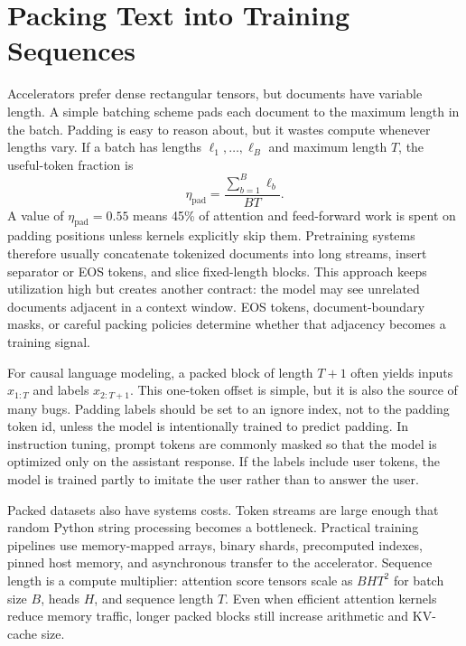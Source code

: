 \section{Packing Text into Training Sequences}
\label{sec:packing-text-training-sequences}

Accelerators prefer dense rectangular tensors, but documents have variable length. A simple batching scheme pads each document to the maximum length in the batch. Padding is easy to reason about, but it wastes compute whenever lengths vary. If a batch has lengths $\ell_1,\ldots,\ell_B$ and maximum length $T$, the useful-token fraction is
\begin{equation}
  \eta_{\mathrm{pad}} = \frac{\sum_{b=1}^{B}\ell_b}{BT}.
\end{equation}
A value of $\eta_{\mathrm{pad}}=0.55$ means 45\% of attention and feed-forward work is spent on padding positions unless kernels explicitly skip them. Pretraining systems therefore usually concatenate tokenized documents into long streams, insert separator or EOS tokens, and slice fixed-length blocks. This approach keeps utilization high but creates another contract: the model may see unrelated documents adjacent in a context window. EOS tokens, document-boundary masks, or careful packing policies determine whether that adjacency becomes a training signal.

For causal language modeling, a packed block of length $T+1$ often yields inputs $x_{1:T}$ and labels $x_{2:T+1}$. This one-token offset is simple, but it is also the source of many bugs. Padding labels should be set to an ignore index, not to the padding token id, unless the model is intentionally trained to predict padding. In instruction tuning, prompt tokens are commonly masked so that the model is optimized only on the assistant response. If the labels include user tokens, the model is trained partly to imitate the user rather than to answer the user.

Packed datasets also have systems costs. Token streams are large enough that random Python string processing becomes a bottleneck. Practical training pipelines use memory-mapped arrays, binary shards, precomputed indexes, pinned host memory, and asynchronous transfer to the accelerator. Sequence length is a compute multiplier: attention score tensors scale as $BHT^2$ for batch size $B$, heads $H$, and sequence length $T$. Even when efficient attention kernels reduce memory traffic, longer packed blocks still increase arithmetic and KV-cache size.

